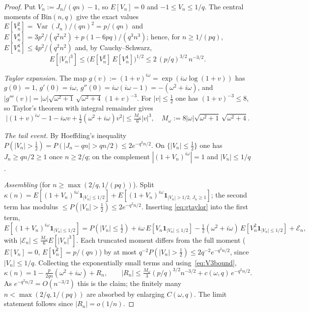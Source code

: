 \documentclass[11pt]{article}
\theoremstyle{definition}
\begin{document}
\begin{proof}
  Put $V_n:=J_n/(qn)-1$, so $E[V_n]=0$ and $-1\le V_n\le1/q$. The
  central moments of $\mathrm{Bin}(n,q)$ give the exact values
  $E[V_n^{2}]=\operatorname{Var}(J_n)/(qn)^{2}=p/(qn)$ and
  $E[V_n^{4}]=3p^{2}/(q^{2}n^{2})+p(1-6pq)/(q^{3}n^{3})$; hence, for
  $n\ge1/(pq)$, $E[V_n^{4}]\le4p^{2}/(q^{2}n^{2})$ and, by
  Cauchy--Schwarz,
  \begin{equation}\label{eq:V3bound}
    E[|V_n|^{3}]\le\bigl(E[V_n^{2}]\,E[V_n^{4}]\bigr)^{1/2}
                \le2\,(p/q)^{3/2}\,n^{-3/2}.
  \end{equation}

  \emph{Taylor expansion.} The map $g(v):=(1+v)^{i\omega}
  =\exp(i\omega\log(1+v))$ has $g(0)=1$, $g'(0)=i\omega$,
  $g''(0)=i\omega(i\omega-1)=-(\omega^{2}+i\omega)$, and
  $|g'''(v)|=|\omega|\sqrt{\omega^{2}+1}\,\sqrt{\omega^{2}+4}\,
  (1+v)^{-3}$. For $|v|\le\tfrac12$ one has $(1+v)^{-3}\le8$, so
  Taylor's theorem with integral remainder gives
  \begin{equation}\label{eq:gtaylor}
    \bigl|(1+v)^{i\omega}-1-i\omega v
          +\tfrac12(\omega^{2}+i\omega)v^{2}\bigr|
    \le\tfrac{M_\omega}{6}|v|^{3},
    \quad M_\omega:=8|\omega|\sqrt{\omega^{2}+1}\,\sqrt{\omega^{2}+4}.
  \end{equation}

  \emph{The tail event.} By Hoeffding's inequality
  $P(|V_n|>\tfrac12)=P(|J_n-qn|>qn/2)\le2e^{-q^{2}n/2}$. On
  $\{|V_n|\le\tfrac12\}$ one has $J_n\ge qn/2\ge1$ once $n\ge2/q$;
  on the complement $|(1+V_n)^{i\omega}|=1$ and $|V_n|\le1/q$.

  \emph{Assembling} (for $n\ge\max(2/q,1/(pq))$). Split
  $\kappa(n)=E[(1+V_n)^{i\omega}\mathbf 1_{|V_n|\le1/2}]
  +E[(1+V_n)^{i\omega}\mathbf 1_{|V_n|>1/2,\,J_n\ge1}]$; the second
  term has modulus $\le P(|V_n|>\tfrac12)\le2e^{-q^{2}n/2}$. Inserting
  \eqref{eq:gtaylor} into the first term,
  \[
    E[(1+V_n)^{i\omega}\mathbf 1_{|V_n|\le1/2}]
    =P(|V_n|\le\tfrac12)+i\omega\,E[V_n\mathbf 1_{|V_n|\le1/2}]
     -\tfrac12(\omega^{2}+i\omega)\,E[V_n^{2}\mathbf 1_{|V_n|\le1/2}]
     +\mathcal E_n,
  \]
  with $|\mathcal E_n|\le\tfrac{M_\omega}{6}E[|V_n|^{3}]$. Each
  truncated moment differs from the full moment ($E[V_n]=0$,
  $E[V_n^{2}]=p/(qn)$) by at most $q^{-2}P(|V_n|>\tfrac12)
  \le2q^{-2}e^{-q^{2}n/2}$, since $|V_n|\le1/q$. Collecting the
  exponentially small terms and using~\eqref{eq:V3bound},
  \[
    \kappa(n)=1-\tfrac{p}{2qn}(\omega^{2}+i\omega)+R_n,
    \qquad
    |R_n|\le\tfrac{M_\omega}{3}(p/q)^{3/2}n^{-3/2}
            +c(\omega,q)\,e^{-q^{2}n/2}.
  \]
  As $e^{-q^{2}n/2}=O(n^{-3/2})$ this is the claim; the finitely many
  $n<\max(2/q,1/(pq))$ are absorbed by enlarging $C(\omega,q)$. The
  limit statement follows since $|R_n|=o(1/n)$.
\end{proof}
\end{document}
